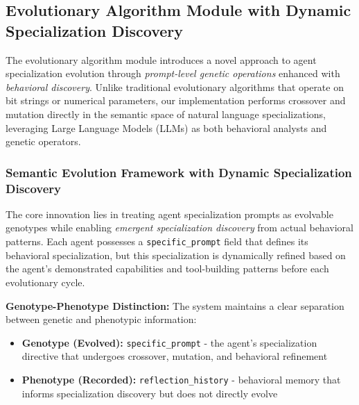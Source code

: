 \subsection{Evolutionary Algorithm Module with Dynamic Specialization Discovery}

The evolutionary algorithm module introduces a novel approach to agent specialization evolution through \textit{prompt-level genetic operations} enhanced with \textit{behavioral discovery}. Unlike traditional evolutionary algorithms that operate on bit strings or numerical parameters, our implementation performs crossover and mutation directly in the semantic space of natural language specializations, leveraging Large Language Models (LLMs) as both behavioral analysts and genetic operators.

\subsubsection{Semantic Evolution Framework with Dynamic Specialization Discovery}

The core innovation lies in treating agent specialization prompts as evolvable genotypes while enabling \textit{emergent specialization discovery} from actual behavioral patterns. Each agent possesses a \texttt{specific\_prompt} field that defines its behavioral specialization, but this specialization is dynamically refined based on the agent's demonstrated capabilities and tool-building patterns before each evolutionary cycle.

\textbf{Genotype-Phenotype Distinction:} The system maintains a clear separation between genetic and phenotypic information:
\begin{itemize}
    \item \textbf{Genotype (Evolved):} \texttt{specific\_prompt} - the agent's specialization directive that undergoes crossover, mutation, and behavioral refinement
    \item \textbf{Phenotype (Recorded):} \texttt{reflection\_history} - behavioral memory that informs specialization discovery but does not directly evolve
\end{itemize}

